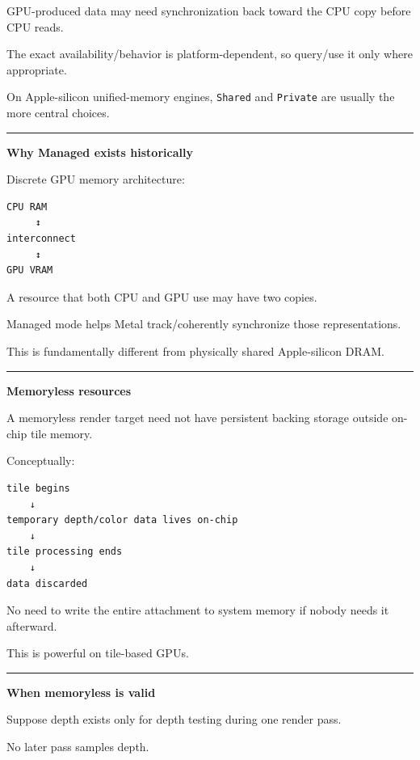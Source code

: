 GPU-produced data may need synchronization back toward the CPU copy before CPU reads.

The exact availability/behavior is platform-dependent, so query/use it only where appropriate.

On Apple-silicon unified-memory engines, \texttt{Shared} and \texttt{Private} are usually the more central choices.

\begin{center}\rule{0.5\linewidth}{0.5pt}\end{center}

\textbf{Why Managed exists historically}

Discrete GPU memory architecture:

\begin{verbatim}
CPU RAM
     ↕
interconnect
     ↕
GPU VRAM
\end{verbatim}

A resource that both CPU and GPU use may have two copies.

Managed mode helps Metal track/coherently synchronize those representations.

This is fundamentally different from physically shared Apple-silicon DRAM.

\begin{center}\rule{0.5\linewidth}{0.5pt}\end{center}

\textbf{Memoryless resources}

A memoryless render target need not have persistent backing storage outside on-chip tile memory.

Conceptually:

\begin{verbatim}
tile begins
    ↓
temporary depth/color data lives on-chip
    ↓
tile processing ends
    ↓
data discarded
\end{verbatim}

No need to write the entire attachment to system memory if nobody needs it afterward.

This is powerful on tile-based GPUs.

\begin{center}\rule{0.5\linewidth}{0.5pt}\end{center}

\textbf{When memoryless is valid}

Suppose depth exists only for depth testing during one render pass.

No later pass samples depth.

